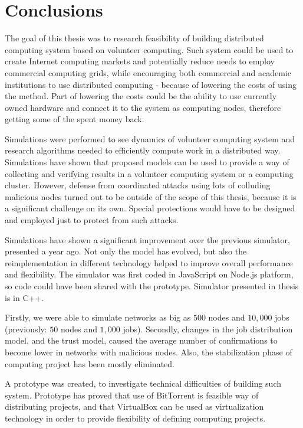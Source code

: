 \chapter{Conclusions}

The goal of this thesis was to research feasibility of building distributed computing system based on volunteer computing. Such system could be used to create Internet computing markets and potentially reduce needs to employ commercial computing grids, while encouraging both commercial and academic institutions to use distributed computing - because of lowering the costs of using the method. Part of lowering the costs could be the ability to use currently owned hardware and connect it to the system as computing nodes, therefore getting some of the spent money back.

Simulations were performed to see dynamics of volunteer computing system and research algorithms needed to efficiently compute work in a distributed way. Simulations have shown that proposed models can be used to provide a way of collecting and verifying results in a volunteer computing system or a computing cluster. However, defense from coordinated attacks using lots of colluding malicious nodes turned out to be outside of the scope of this thesis, because it is a significant challenge on its own. Special protections would have to be designed and employed just to protect from such attacks.

Simulations have shown a significant improvement over the previous simulator, presented a year ago\cite{zochniakreliable}. Not only the model has evolved, but also the reimplementation in different technology helped to improve overall performance and flexibility. The simulator was first coded in JavaScript on Node.js platform, so code could have been shared with the prototype. Simulator presented in thesis is in C++.

Firstly, we were able to simulate networks as big as $500$ nodes and $10,000$ jobs (previously: $50$ nodes and $1,000$ jobs). Secondly, changes in the job distribution model, and the trust model, caused the average number of confirmations to become lower in networks with malicious nodes. Also, the stabilization phase of computing project has been mostly eliminated.

A prototype was created, to investigate technical difficulties of building such system. Prototype has proved that use of BitTorrent is feasible way of distributing projects, and that VirtualBox can be used as virtualization technology in order to provide flexibility of defining computing projects.

